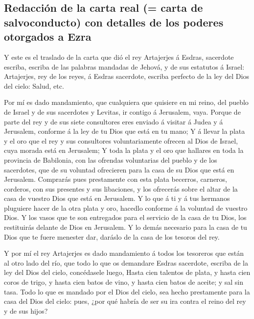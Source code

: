 \hypertarget{redacciuxf3n-de-la-carta-real-carta-de-salvoconducto-con-detalles-de-los-poderes-otorgados-a-ezra}{%
\subsection{Redacción de la carta real (= carta de salvoconducto) con
detalles de los poderes otorgados a
Ezra}\label{redacciuxf3n-de-la-carta-real-carta-de-salvoconducto-con-detalles-de-los-poderes-otorgados-a-ezra}}

 Y este es el traslado de la carta que dió el rey
Artajerjes á Esdras, sacerdote escriba, escriba de las palabras mandadas
de Jehová, y de sus estatutos á Israel:  Artajerjes, rey
de los reyes, á Esdras sacerdote, escriba perfecto de la ley del Dios
del cielo: Salud, etc.

 Por mí es dado mandamiento, que cualquiera que quisiere
en mi reino, del pueblo de Israel y de sus sacerdotes y Levitas, ir
contigo á Jerusalem, vaya.  Porque de parte del rey y de
sus siete consultores eres enviado á visitar á Judea y á Jerusalem,
conforme á la ley de tu Dios que está en tu mano;  Y á
llevar la plata y el oro que el rey y sus consultores voluntariamente
ofrecen al Dios de Israel, cuya morada está en Jerusalem;
 Y toda la plata y el oro que hallares en toda la
provincia de Babilonia, con las ofrendas voluntarias del pueblo y de los
sacerdotes, que de su voluntad ofrecieren para la casa de su Dios que
está en Jerusalem.  Comprarás pues prestamente con esta
plata becerros, carneros, corderos, con sus presentes y sus libaciones,
y los ofrecerás sobre el altar de la casa de vuestro Dios que está en
Jerusalem.  Y lo que á ti y á tus hermanos pluguiere
hacer de la otra plata y oro, hacedlo conforme á la voluntad de vuestro
Dios.  Y los vasos que te son entregados para el servicio
de la casa de tu Dios, los restituirás delante de Dios en Jerusalem.
 Y lo demás necesario para la casa de tu Dios que te
fuere menester dar, daráslo de la casa de los tesoros del rey.

 Y por mí el rey Artajerjes es dado mandamiento á todos
los tesoreros que están al otro lado del río, que todo lo que os
demandare Esdras sacerdote, escriba de la ley del Dios del cielo,
concédasele luego,  Hasta cien talentos de plata, y hasta
cien coros de trigo, y hasta cien batos de vino, y hasta cien batos de
aceite; y sal sin tasa.  Todo lo que es mandado por el
Dios del cielo, sea hecho prestamente para la casa del Dios del cielo:
pues, ¿por qué habría de ser su ira contra el reino del rey y de sus
hijos?

